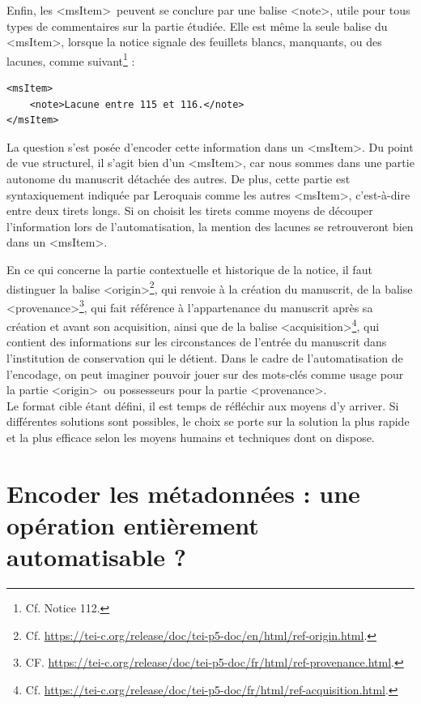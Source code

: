 \documentclass[a4paper,12pt,twoside]{book}
\begin{document}
Enfin, les \textless msItem\textgreater~peuvent se conclure par une balise \textless note\textgreater, utile pour tous types de commentaires sur la partie étudiée. Elle est même la seule balise du \textless msItem\textgreater, lorsque la notice signale des feuillets blancs, manquants, ou des lacunes, comme suivant\footnote{Cf. Notice 112.} :

\begin{verbatim}
<msItem>
    <note>Lacune entre 115 et 116.</note>
</msItem>
\end{verbatim} 

La question s'est posée d'encoder cette information dans un \textless msItem\textgreater . Du point de vue structurel, il s’agit bien d’un \textless msItem\textgreater, car nous sommes dans une partie autonome du manuscrit détachée des autres. De plus, cette partie est syntaxiquement indiquée par Leroquais comme les autres \textless msItem\textgreater, c'est-à-dire entre deux tirets longs. Si on choisit les tirets comme moyens de découper l’information lors de l’automatisation, la mention des lacunes se retrouveront bien dans un \textless msItem\textgreater .

En ce qui concerne la partie contextuelle et historique de la notice, il faut distinguer la balise \textless origin\textgreater \footnote{Cf. \url{https://tei-c.org/release/doc/tei-p5-doc/en/html/ref-origin.html}.}, qui renvoie à la création du manuscrit, de la balise \textless provenance\textgreater \footnote{CF. \url{https://tei-c.org/release/doc/tei-p5-doc/fr/html/ref-provenance.html}.}, qui fait référence à l’appartenance du manuscrit après sa création et avant son acquisition, ainsi que de la balise \textless acquisition\textgreater \footnote{Cf. \url{https://tei-c.org/release/doc/tei-p5-doc/fr/html/ref-acquisition.html}.}, qui contient des informations sur les circonstances de l'entrée du manuscrit dans l'institution de conservation qui le détient. Dans le cadre de l'automatisation de l'encodage, on peut imaginer pouvoir jouer sur des mots-clés comme \og usage\fg{} pour la partie \textless origin\textgreater~ou \og possesseurs\fg{} pour la partie \textless provenance\textgreater .\\

Le format cible étant défini, il est temps de réfléchir aux moyens d’y arriver. Si différentes solutions sont possibles, le choix se porte sur la solution la plus rapide et la plus efficace selon les moyens humains et techniques dont on dispose.

	\section{Encoder les métadonnées : une opération entièrement automatisable ? }
	
\end{document}
